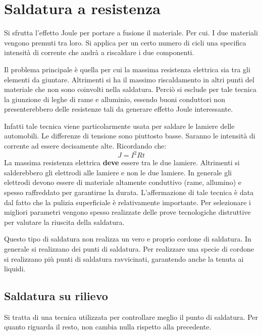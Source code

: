 \section{Saldatura a resistenza}
Si sfrutta l'effetto Joule per portare a fusione il materiale.
Per cui. I due materiali vengono premuti tra loro. Si applica per un certo numero di cicli una specifica intensità di corrente che andrà a riscaldare i due componenti.

Il problema principale è quella per cui la massima resistenza elettrica sia tra gli elementi da giuntare. Altrimenti si ha il massimo riscaldamento in altri punti del materiale che non sono coinvolti nella saldatura.
Perciò si esclude per tale tecnica la giunzione di leghe di rame e alluminio, essendo buoni conduttori non presenterebbero delle resistenze tali da generare effetto Joule interessante.

Infatti tale tecnica viene particolarmente usata per saldare le lamiere delle automobili.
Le differenze di tensione sono piuttosto basse. Saranno le intensità di corrente ad essere decisamente alte. Ricordando che:
\begin{equation}
J = I^2Rt
\end{equation}
La massima resistenza elettrica \textbf{deve} essere tra le due lamiere.
Altrimenti si salderebbero gli elettrodi alle lamiere e non le due lamiere.
In generale gli elettrodi devono essere di materiale altamente conduttivo (rame, allumino) e spesso raffreddato per garantirne la durata.
L'affermazione di tale tecnica è data dal fatto che la pulizia superficiale è relativamente importante. Per selezionare i migliori parametri vengono spesso realizzate delle prove tecnologiche distruttive per valutare la riuscita della saldatura.

Questo tipo di saldatura non realizza un vero e proprio cordone di saldatura. In generale si realizzano dei punti di saldatura.
Per realizzare una specie di cordone si realizzano più punti di saldatura ravvicinati, garantendo anche la tenuta ai liquidi.

\subsection{Saldatura su rilievo}
Si tratta di una tecnica utilizzata per controllare meglio il punto di saldatura. Per quanto riguarda il resto, non cambia nulla rispetto alla precedente.

